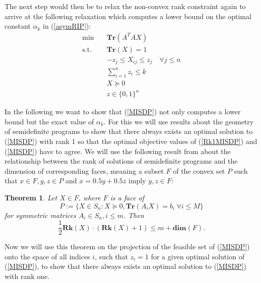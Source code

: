 \documentclass{elsarticle}
\newtheorem{thm}{Theorem}
\begin{document}
The next step would then be to relax the non-convex rank constraint again to arrive at the following relaxation which computes a lower bound on the optimal constant $\alpha_k$ in (\ref{asymRIP}):
\begin{align}\label{MISDP}
 \text{min} \quad & \textbf{Tr}(A^TAX) \nonumber \\
 \text{s.t.} \quad & \textbf{Tr}(X) = 1 \nonumber \\
 & -z_j \leq X_{ij} \leq z_j \quad \forall j \leq n \nonumber \\
 & \sum_{i=1}^n z_i \leq k \tag{MISDP} \\
 & X \succeq 0  \nonumber \\
 & z \in \{0,1\}^n \nonumber
\end{align}

In the following we want to show that (\ref{MISDP}) not only computes a lower bound but the exact value of $\alpha_k$. For this we will use results about the geometry of semidefinite programs to show that there always exists an 
optimal solution to (\ref{MISDP}) with rank 1 so that the optimal objective values of (\ref{Rk1MISDP}) and (\ref{MISDP}) have to agree. We will use the following result from \cite{pat98} about the relationship between the rank of
solutions of semidefinite programs and the dimension of corresponding faces, meaning a subset $F$ of the convex set $P$ such that $x \in F, y, z \in P$ and $x = 0.5y + 0.5z$ imply $y,z \in F$:

\begin{thm}\label{patakiLemma}
 Let $X \in F$, where $F$ is a face of
 \begin{equation*}
 P := \{X \in S_n : X \succeq 0, \textbf{Tr}(A_i X) = b_i \ \forall i \leq M\}
 \end{equation*}
 for symmetric matrices $A_i \in S_n, i \leq m$. Then
 \begin{equation*}
  \frac{1}{2}\textbf{Rk}(X)\cdot(\textbf{Rk}(X)+1) \leq m + \textbf{dim}(F).
 \end{equation*}
\end{thm}

Now we will use this theorem on the projection of the feasible set of (\ref{MISDP}) onto the space of all indices $i$, such that $z_i = 1$ for a given optimal solution of (\ref{MISDP}), to show that there always exists an optimal 
solution to (\ref{MISDP}) with rank one.
\end{document}
